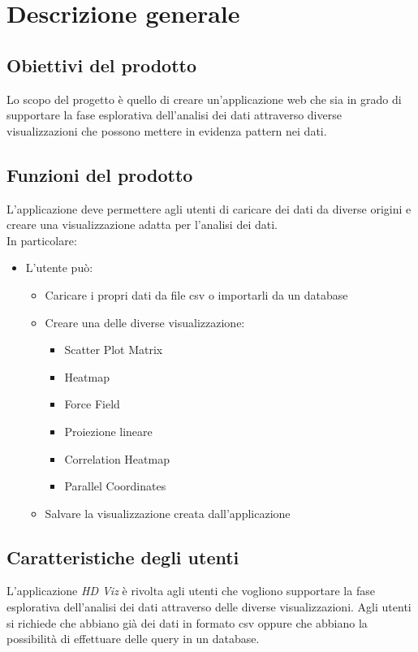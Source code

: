 \section{Descrizione generale}

\subsection{Obiettivi del prodotto}
    Lo scopo del progetto è quello di creare un'applicazione web che sia in grado di supportare la fase esplorativa dell'analisi dei dati attraverso diverse visualizzazioni che possono mettere in evidenza pattern nei dati.

\subsection{Funzioni del prodotto}
    L'applicazione deve permettere agli utenti di caricare dei dati da diverse origini e creare una visualizzazione adatta per l'analisi dei dati.
    \\
    In particolare:
    \begin{itemize}
        \item L'utente può:
        \begin{itemize}
            \item Caricare i propri dati da file csv o importarli da un database
            \item Creare una delle diverse visualizzazione:
            \begin{itemize}
                \item Scatter Plot Matrix
                \item Heatmap
                \item Force Field
                \item Proiezione lineare
                \item Correlation Heatmap
                \item Parallel Coordinates
            \end{itemize}
            \item Salvare la visualizzazione creata dall'applicazione
        \end{itemize}
    \end{itemize}
    
\subsection{Caratteristiche degli utenti}
L'applicazione \emph{HD Viz} è rivolta agli utenti che vogliono supportare la fase esplorativa dell'analisi dei dati attraverso delle diverse visualizzazioni. Agli utenti si richiede che abbiano già dei dati in formato csv oppure che abbiano la possibilità di effettuare delle query in un database.


